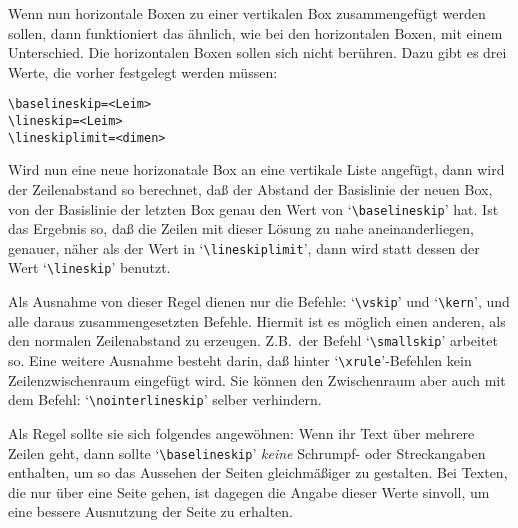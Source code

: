 Wenn nun horizontale Boxen zu einer vertikalen Box zusammengef\"ugt
werden sollen, dann funktioniert das \"ahnlich, wie bei den horizontalen
Boxen, mit einem Unterschied. Die horizontalen Boxen sollen sich nicht
ber\"uhren. Dazu gibt es drei Werte, die vorher festgelegt werden
m\"ussen:
\begin{verbatim}
\baselineskip=<Leim>
\lineskip=<Leim>
\lineskiplimit=<dimen>
\end{verbatim}
Wird nun eine neue horizonatale Box an eine vertikale
Liste angef\"ugt,
dann wird der 
Zeilenabstand so berechnet, da\ss{} der Abstand der
Basislinie der neuen 
Box, von der Basislinie der letzten Box genau den
Wert von `\verb|\baselineskip|' hat. Ist das Ergebnis so, da\ss{} die
Zeilen mit dieser L\"osung zu nahe aneinanderliegen, genauer, n\"aher als
der Wert in `\verb|\lineskiplimit|', dann wird statt dessen der Wert
`\verb|\lineskip|' benutzt.

Als Ausnahme von dieser Regel dienen nur die Befehle:
`\verb|\vskip|'
und 
`\verb|\kern|', und alle daraus zusammengesetzten Befehle. Hiermit
ist es m\"oglich einen anderen, als den normalen 
Zeilenabstand zu
erzeugen. Z.B.\ der Befehl
`\verb|\smallskip|' arbeitet so. Eine
weitere Ausnahme besteht darin, da\ss{} hinter
`\verb|\xrule|'-Befehlen
kein 
Zeilenzwischenraum eingef\"ugt wird. Sie k\"onnen den 
Zwischenraum
aber auch mit dem Befehl: 
`\verb|\nointerlineskip|' selber verhindern.

Als Regel sollte sie sich folgendes angew\"ohnen: Wenn ihr Text \"uber
mehrere Zeilen geht, dann sollte 
`\verb|\baselineskip|' {\em keine}
Schrumpf- oder Streckangaben enthalten, um so das Aussehen der
Seiten
gleichm\"a\ss{}iger zu gestalten. Bei Texten, die nur \"uber eine Seite gehen,
ist dagegen die Angabe dieser Werte sinvoll, um eine bessere
Ausnutzung der Seite zu erhalten.

